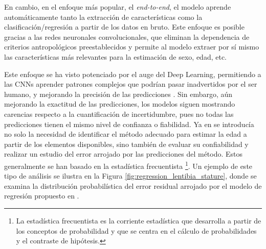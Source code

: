 En cambio, en el enfoque más popular, el \textit{end-to-end}, el modelo aprende automáticamente tanto la 
extracción de características como la clasificación/regresión a partir de los datos en bruto. Este enfoque es 
posible gracias a las redes neuronales convolucionales, que eliminan la dependencia de criterios 
antropológicos preestablecidos y permite al modelo extraer por sí mismo las características más relevantes 
para la estimación de sexo, edad, etc. 

Este enfoque se ha visto potenciado por el auge del Deep Learning, permitiendo a las CNNs aprender patrones 
complejos que podrían pasar inadvertidos por el ser humano, y mejorando la precisión de las predicciones 
\cite{stern2019, venema2022}. 
Sin embargo, aún mejorando la exactitud de las predicciones, los modelos siguen mostrando carencias respecto a 
la cuantificación de incertidumbre, pues no todas las predicciones tienen el mismo nivel de confianza o 
fiabilidad. Ya en \cite{ferrante2009} se introducía no solo la necesidad de identificar el método adecuado 
para estimar la edad a partir de los elementos disponibles, sino también de evaluar su confiabilidad y 
realizar un estudio del error arrojado por las predicciones del método. Estos generalmente se han basado en 
la estadística frecuentista \cite{verma2020, stepanovsky2024, heinrich2024}
\footnote{
    La estadística frecuentista es la corriente estadística que desarrolla a partir de los conceptos de 
    probabilidad y que se centra en el cálculo de probabilidades y el contraste de hipótesis.
}.
Un ejemplo de este tipo de análisis se ilustra en la Figura \ref{fig:regression_lentibia_stature}, donde se 
examina la distribución probabilística del error residual arrojado por el modelo de regresión propuesto en 
\cite{verma2020}.


